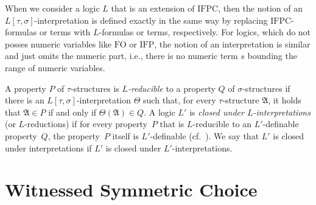 \documentclass[]{lmcs}
\newcommand{\defining}[1]{\emph{#1}}
\newcommand{\termA}{s}
\newcommand{\interpret}{\Theta}
\newcommand{\Struct}{\mathfrak{A}}
\newcommand{\sig}{\tau}
\newcommand{\sigA}{\tau}
\newcommand{\sigB}{\sigma}
\newcommand{\FO}{\ensuremath{\mathrm{FO}}}
\newcommand{\IFP}{\ensuremath{\mathrm{IFP}}}
\newcommand{\IFPC}{\ensuremath{\mathrm{IFPC}}}
\begin{document}
When we consider a logic $L$ that is an extension of \IFPC{},
then the notion of an $L[\sigA,\sigB]$-interpretation
is defined exactly in the same way
by replacing \IFPC{}-formulas or terms with $L$-formulas or terms, respectively.
For logics, which do not posses numeric variables like \FO{} or \IFP{},
the notion of an interpretation is similar and just omits the numeric part,
i.e., there is no numeric term $\termA$ bounding the range of numeric variables.


A property $P$ of $\sig$-structures is \defining{$L$-reducible} to 
a property $Q$ of $\sigB$-structures
if there is an $L[\sig, \sigB]$-interpretation $\interpret$
such that, for every $\sig$-structure
$\Struct$, it holds that $\Struct \in P$ if and only if $\interpret(\Struct) \in Q$.
A logic $L'$ is \defining{closed under $L$-interpretations} (or $L$-reductions)
if for every property~$P$ that is $L$-reducible to an $L'$-definable property~$Q$, the property~$P$ itself is $L'$-definable (cf.~\cite{ebbinghaus1985,Otto1997}).
We say that $L'$ is closed under interpretations
if $L'$ is closed under $L'$-interpretations.


\section{Witnessed Symmetric Choice}
\label{sec:witnessed-symmetric-choice}
\end{document}
